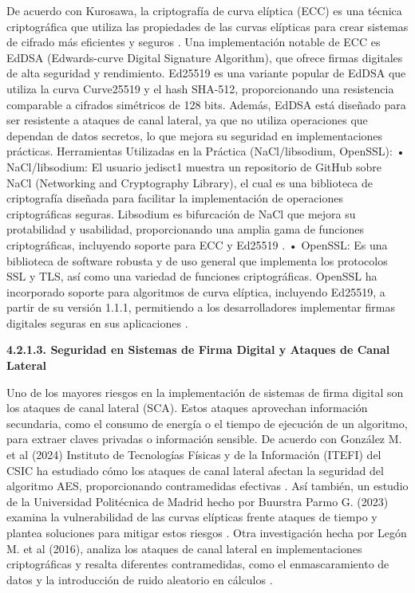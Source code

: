 \documentclass{amsart}
\begin{document}
    De acuerdo con Kurosawa, la criptografía de curva elíptica (ECC) es una técnica criptográfica que utiliza las propiedades de las curvas elípticas para crear sistemas de cifrado más eficientes y seguros \parencite{kurosawa}. Una implementación notable de ECC es EdDSA (Edwards-curve Digital Signature Algorithm), que ofrece firmas digitales de alta seguridad y rendimiento.
    Ed25519 es una variante popular de EdDSA que utiliza la curva Curve25519 y el hash SHA-512, proporcionando una resistencia comparable a cifrados simétricos de 128 bits. Además, EdDSA está diseñado para ser resistente a ataques de canal lateral, ya que no utiliza operaciones que dependan de datos secretos, lo que mejora su seguridad en implementaciones prácticas.
    Herramientas Utilizadas en la Práctica (NaCl/libsodium, OpenSSL):
        •	NaCl/libsodium: El usuario jedisct1 muestra un repositorio de GitHub sobre NaCl (Networking and Cryptography Library), el cual es una biblioteca de criptografía diseñada para facilitar la implementación de operaciones criptográficas seguras. Libsodium es bifurcación de NaCl que mejora su protabilidad y usabilidad, proporcionando una amplia gama de funciones criptográficas, incluyendo soporte para ECC y Ed25519 \parencite{jedisct1}.
        •	OpenSSL: Es una biblioteca de software robusta y de uso general que implementa los protocolos SSL y TLS, así como una variedad de funciones criptográficas. OpenSSL ha incorporado soporte para algoritmos de curva elíptica, incluyendo Ed25519, a partir de su versión 1.1.1, permitiendo a los desarrolladores implementar firmas digitales seguras en sus aplicaciones \parencite{openssl}.
    
        
    \textbf{ 4.2.1.3. Seguridad en Sistemas de Firma Digital y Ataques de Canal Lateral }
    
    Uno de los mayores riesgos en la implementación de sistemas de firma digital son los ataques de canal lateral (SCA). Estos ataques aprovechan información secundaria, como el consumo de energía o el tiempo de ejecución de un algoritmo, para extraer claves privadas o información sensible.
    De acuerdo con González M. et al (2024) Instituto de Tecnologías Físicas y de la Información (ITEFI) del CSIC ha estudiado cómo los ataques de canal lateral afectan la seguridad del algoritmo AES, proporcionando contramedidas efectivas \parencite{gonzalez}. Así también, un estudio de la Universidad Politécnica de Madrid hecho por Buurstra Parmo G. (2023) examina la vulnerabilidad de las curvas elípticas frente ataques de tiempo y plantea soluciones para mitigar estos riesgos \parencite{buurstra}.
    Otra investigación hecha por Legón M. et al (2016), analiza los ataques de canal lateral en implementaciones criptográficas y resalta diferentes contramedidas, como el enmascaramiento de datos y la introducción de ruido aleatorio en cálculos \parencite{legon}.
    
\end{document}
